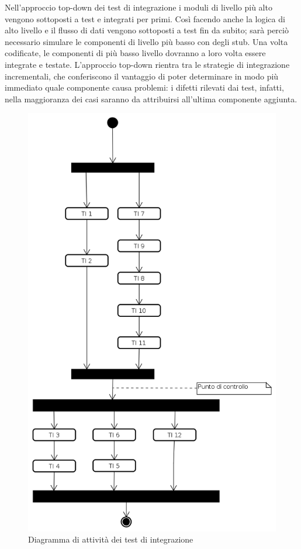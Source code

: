 Nell'approccio top-down dei test di integrazione i moduli di livello più alto vengono sottoposti a test e integrati per primi. Così facendo anche la logica di alto livello e il flusso di dati vengono sottoposti a test fin da subito; sarà perciò necessario simulare le componenti di livello più basso con degli stub. Una volta codificate, le componenti di più basso livello dovranno a loro volta essere integrate e testate. L'approccio top-down rientra tra le strategie di integrazione incrementali, che conferiscono il vantaggio di poter determinare in modo più immediato quale componente causa problemi: i difetti rilevati dai test, infatti, nella maggioranza dei casi saranno da attribuirsi all'ultima componente aggiunta.
\begin{figure}[ht]
	\centering
	\includegraphics[scale=0.45]{DiagrammaDiAttivita.png}
	\caption{Diagramma di attività dei test di integrazione}
\end{figure}
\FloatBarrier

